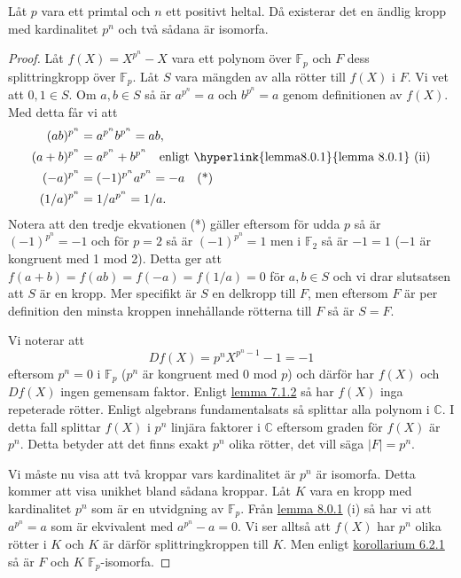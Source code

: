 \documentclass{article}
\theoremstyle{definition}
\begin{document}
\begin{mytheo}{}{}
  Låt $p$ vara ett primtal och $n$ ett positivt heltal. Då existerar det en ändlig kropp med kardinalitet $p^n$ och två sådana är isomorfa. 
\end{mytheo}

\begin{proof}
  Låt $f(X) = X^{p^n} -X$ vara ett polynom över $\mathbb{F}_p$ och $F$ dess splittringkropp över $\mathbb{F}_p.$ Låt $S$ vara mängden 
  av alla rötter till $f(X)$ i $F$. Vi vet att $0, 1 \in S$. Om $a, b \in S$ så är $a^{p^n} = a$ och $b^{p^n} = a$ genom definitionen av $f(X).$ 
  Med detta får vi att 
  \begin{align*}
    (ab)^{p^n} &= a^{p^n}b^{p^n} = ab, \\
    (a + b)^{p^n} &= a^{p^n} + b^{p^n} \quad \textnormal{enligt \hyperlink{lemma8.0.1}{lemma 8.0.1} (ii)} \\
    (-a)^{p^n} &= (-1)^{p^n}a^{p^n} = -a \quad \textnormal{(*)} \\
    (1/a)^{p^n} &= 1/a^{p^n} = 1/a.
  \end{align*}
  Notera att den tredje ekvationen (*) gäller eftersom för udda $p$ så är $(-1)^{p^n} = -1$ och för $p = 2$ så är $(-1)^{p^n} = 1$
  men i $\mathbb{F}_2$ så är $-1 = 1$ ($-1$ är kongruent med 1 mod 2). Detta ger att 
  $f(a + b) = f(ab) = f(-a) = f(1/a) = 0$ för $a, b \in S$ och vi drar slutsatsen att $S$ är en kropp. Mer specifikt är $S$ en delkropp till $F$, 
  men eftersom $F$ är per definition den minsta kroppen innehållande rötterna till $F$ så är $S = F.$

  Vi noterar att 
  \[Df(X) = p^nX^{p^n-1} - 1 = -1\]
  eftersom $p^n = 0$ i $\mathbb{F}_p$ ($p^n$ är kongruent med 0 mod $p$) och därför har $f(X)$ och $Df(X)$ ingen gemensam faktor. Enligt 
  \hyperlink{lemma7.1.2}{lemma 7.1.2} så har $f(X)$ inga repeterade rötter. Enligt algebrans fundamentalsats så splittar 
  alla polynom i $\mathbb{C}$. I detta fall splittar $f(X)$ i $p^n$ linjära faktorer i $\mathbb{C}$ eftersom graden för $f(X)$ är $p^n$. 
  Detta betyder att det finns exakt $p^n$ olika rötter, det vill säga $|F| = p^n$. 

  Vi måste nu visa att två kroppar vars kardinalitet är $p^n$ är isomorfa. Detta kommer att visa unikhet bland sådana kroppar. Låt $K$ vara
  en kropp med kardinalitet $p^n$ som är en utvidgning av $\mathbb{F}_p$. Från \hyperlink{lemma8.0.1}{lemma 8.0.1} (i) så har vi att
  $a^{p^n} = a$ som är ekvivalent med $a^{p^n} - a = 0$. Vi ser alltså att $f(X)$ har $p^n$ olika rötter i $K$ och 
  $K$ är därför splittringkroppen till $K$. Men enligt \hyperlink{kol6.2.1}{korollarium 6.2.1} så är $F$ och $K$ $\mathbb{F}_p$-isomorfa.
\end{proof}
\end{document}
